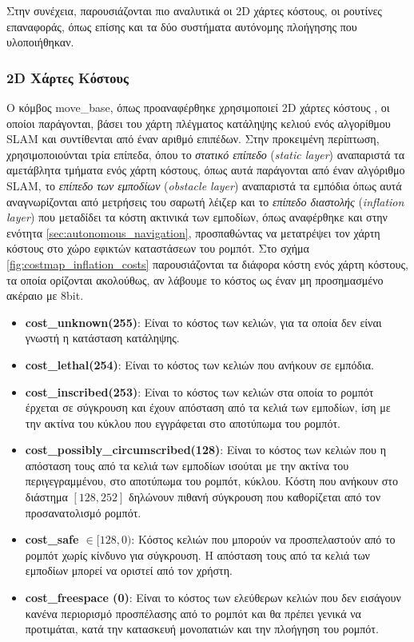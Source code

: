 Στην συνέχεια, παρουσιάζονται πιο αναλυτικά οι 2D χάρτες κόστους, οι ρουτίνες επαναφοράς, όπως επίσης και τα δύο συστήματα αυτόνομης πλοήγησης που υλοποιήθηκαν.

\subsubsection{2D Χάρτες Κόστους}
\bigskip
Ο κόμβος move{\_}base, όπως προαναφέρθηκε χρησιμοποιεί 2D χάρτες κόστους \cite{costmap_2d}, οι οποίοι παράγονται, βάσει του χάρτη πλέγματος κατάληψης κελιού ενός αλγορίθμου SLAM και συντίθενται από έναν αριθμό επιπέδων. Στην προκειμένη περίπτωση, χρησιμοποιούνται τρία επίπεδα, όπου το \textit{στατικό επίπεδο} (\textit{static layer}) αναπαριστά τα αμετάβλητα τμήματα ενός χάρτη κόστους, όπως αυτά παράγονται από έναν αλγόριθμο SLAM, το \textit{επίπεδο των εμποδίων} (\textit{obstacle layer}) αναπαριστά τα εμπόδια όπως αυτά αναγνωρίζονται από μετρήσεις του σαρωτή λέιζερ και το \textit{επίπεδο διαστολής} (\textit{inflation layer}) που μεταδίδει τα κόστη ακτινικά των εμποδίων, όπως αναφέρθηκε και στην ενότητα \ref{sec:autonomous_navigation}, προσπαθώντας να μετατρέψει τον χάρτη κόστους στο χώρο εφικτών καταστάσεων του ρομπότ. Στο σχήμα \ref{fig:costmap_inflation_costs} παρουσιάζονται τα διάφορα κόστη ενός χάρτη κόστους, τα οποία ορίζονται ακολούθως, αν λάβουμε το κόστος ως έναν μη προσημασμένο ακέραιο με 8bit.

\begin{itemize}
	\item \textbf{cost{\_}unknown(255)}: Είναι το κόστος των κελιών, για τα οποία δεν είναι γνωστή η κατάσταση κατάληψης.
	\item \textbf{cost{\_}lethal(254)}: Είναι το κόστος των κελιών που ανήκουν σε εμπόδια.
	\item \textbf{cost{\_}inscribed(253)}: Είναι το κόστος των κελιών στα οποία το ρομπότ έρχεται σε σύγκρουση και έχουν απόσταση από τα κελιά των εμποδίων, ίση με την ακτίνα του κύκλου που εγγράφεται στο αποτύπωμα του ρομπότ.
	\item \textbf{cost{\_}possibly{\_}circumscribed(128)}: Είναι το κόστος των κελιών που η απόσταση τους από τα κελιά των εμποδίων ισούται με την ακτίνα του περιγεγραμμένου, στο αποτύπωμα του ρομπότ, κύκλου. Κόστη που ανήκουν στο διάστημα $[128, 252]$ δηλώνουν πιθανή σύγκρουση που καθορίζεται από τον προσανατολισμό ρομπότ.
	\item \textbf{cost{\_}safe $\in [128,0)$}: Κόστος κελιών που μπορούν να προσπελαστούν από το ρομπότ χωρίς κίνδυνο για σύγκρουση. Η απόσταση τους από τα κελιά των εμποδίων μπορεί να οριστεί από τον χρήστη. 
	\item \textbf{cost{\_}freespace (0)}: Είναι το κόστος των ελεύθερων κελιών που δεν εισάγουν κανένα περιορισμό προσπέλασης από το ρομπότ και θα πρέπει γενικά να προτιμάται, κατά την κατασκευή μονοπατιών και την πλοήγηση του ρομπότ.
\end{itemize}

